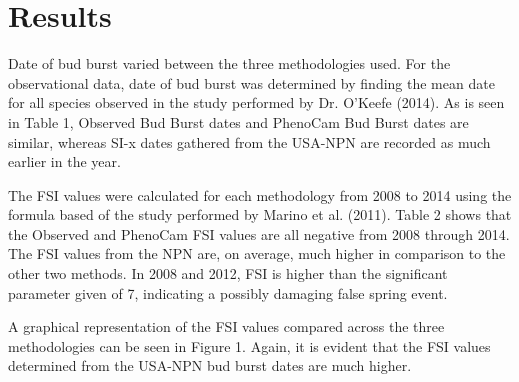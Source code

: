 \documentclass{article}\usepackage[]{graphicx}\usepackage[]{color}
\makeatletter
\newenvironment{kframe}{%
 \def\at@end@of@kframe{}%
 \ifinner\ifhmode%
  \def\at@end@of@kframe{\end{minipage}}%
  \begin{minipage}{\columnwidth}%
 \fi\fi%
 \def\FrameCommand##1{\hskip\@totalleftmargin \hskip-\fboxsep
 \colorbox{shadecolor}{##1}\hskip-\fboxsep
     \hskip-\linewidth \hskip-\@totalleftmargin \hskip\columnwidth}%
 \MakeFramed {\advance\hsize-\width
   \@totalleftmargin\z@ \linewidth\hsize
   \@setminipage}}%
 {\par\unskip\endMakeFramed%
 \at@end@of@kframe}
\makeatother
\begin{document}
\section{Results}
Date of bud burst varied between the three methodologies used. For the observational data, date of bud burst was determined by finding the mean date for all species observed in the study performed by Dr. O'Keefe (2014). %
As is seen in Table 1, Observed Bud Burst dates and PhenoCam Bud Burst dates are similar, whereas SI-x dates gathered from the USA-NPN are recorded as much earlier in the year.

\begin{kframe}


{\ttfamily\noindent\bfseries{}}

{\ttfamily\noindent\bfseries{}}\end{kframe}
The FSI values were calculated for each methodology from 2008 to 2014 using the formula based of the study performed by Marino et al. (2011). Table 2 shows that the Observed and PhenoCam FSI values are all negative from 2008 through 2014. The FSI values from the NPN are, on average, much higher in comparison to the other two methods. In 2008 and 2012, FSI is higher than the significant parameter given of 7, indicating a possibly damaging false spring event. 
\begin{kframe}


{\ttfamily\noindent\bfseries{}}\end{kframe}

A graphical representation of the FSI values compared across the three methodologies can be seen in Figure 1.  Again, it is evident that the FSI values determined from the USA-NPN bud burst dates are much higher.

\begin{kframe}


{\ttfamily\noindent\bfseries\color{errorcolor}{\#\# Error in plot(methodplot): object 'methodplot' not found}}\end{kframe}
\end{document}
